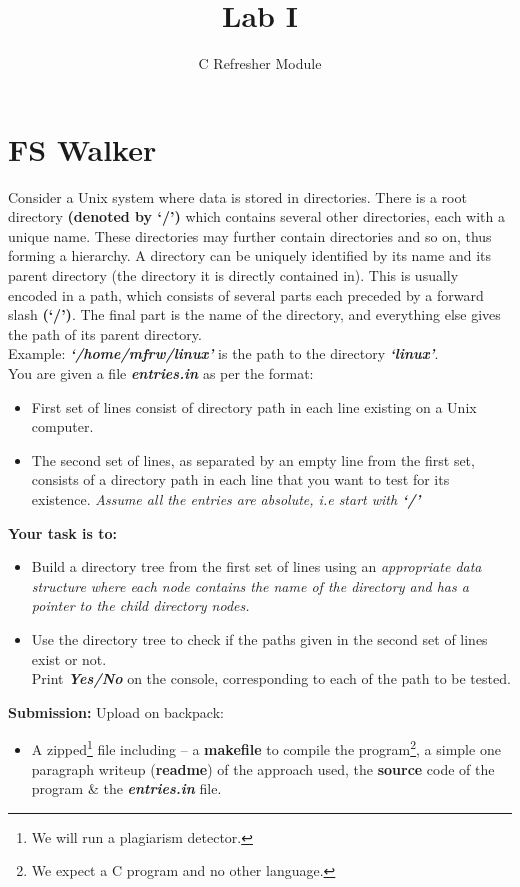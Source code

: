 \documentclass[9pt]{article}
\title{\vspace{-7cm}}
\begin{document}
\title{Lab I}
\author{C Refresher Module}

\maketitle

\section{FS Walker}
Consider a Unix system where data is stored in directories. There is a root directory \textbf{(denoted by ‘/’)} which contains several other directories, each with a unique name. 
These directories may further contain directories and so on, thus forming a hierarchy. A directory can be uniquely identified by its name and its parent directory (the directory 
it is directly contained in). This is usually encoded in a path, which consists of several parts each preceded by a forward slash \textbf{(`/')}. The final part is the name of the directory, 
and everything else gives the path of its parent directory. \\
Example: \textit{\textbf{`/home/mfrw/linux'}} is the path to the directory \textit{\textbf{`linux'}}. \\

You are given a file \textit{\textbf{entries.in}} as per the format:
\begin{itemize}
	\item First set of lines consist of directory path in each line existing on a Unix computer.
	\item The second set of lines, as separated by an empty line from the first set, consists of a directory path in each line that you want to test for its existence.
		\em{Assume all the entries are absolute, i.e start with \textbf{`/'}} \em
\end{itemize}
\textbf{Your task is to:}
\begin{itemize}
	\item Build a directory tree from the first set of lines using an \em{appropriate} \em data structure where each node contains the name of the directory and has a pointer to the child directory nodes.
	\item Use the directory tree to check if the paths given in the second set of lines exist or not.\\
		Print \textit{\textbf{Yes/No}} on the console, corresponding to each of the path to be tested.
\end{itemize}
\renewcommand{\thefootnote}{\fnsymbol{footnote}}
\textbf{Submission:} Upload on backpack:
\begin{itemize}
	\item A zipped\footnote[2]{We will run a plagiarism detector.} file including -- a \textbf{makefile} to compile the program\footnote[3]{We expect a C program and no other language.},
	a simple one paragraph writeup (\textbf{readme}) of the approach used,
		the \textbf{source} code of the program \& the \textit{\textbf{entries.in}} file.
\end{itemize}
\end{document}
